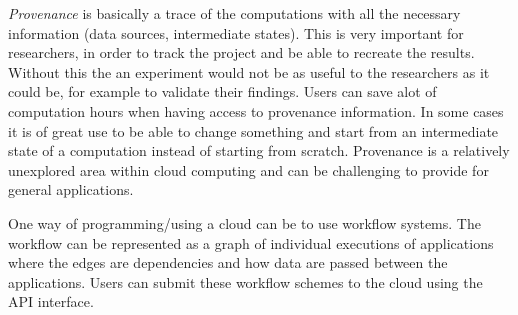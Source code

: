 

\emph{Provenance} is basically a trace of the computations with all
the necessary information (data sources, intermediate states). This is
very important for researchers, in order to track the project and be
able to recreate the results. Without this the an experiment would not
be as useful to the researchers as it could be, for example to
validate their findings. Users can save alot of computation hours when
having access to provenance information. In some cases it is of great
use to be able to change something and start from an intermediate
state of a computation instead of starting from scratch. Provenance is
a relatively unexplored area within cloud computing and can be
challenging to provide for general applications.




One way of programming/using a cloud can be to use workflow
systems. The workflow can be represented as a graph of individual
executions of applications where the edges are dependencies and how
data are passed between the applications. Users can submit these
workflow schemes to the cloud using the API interface.





